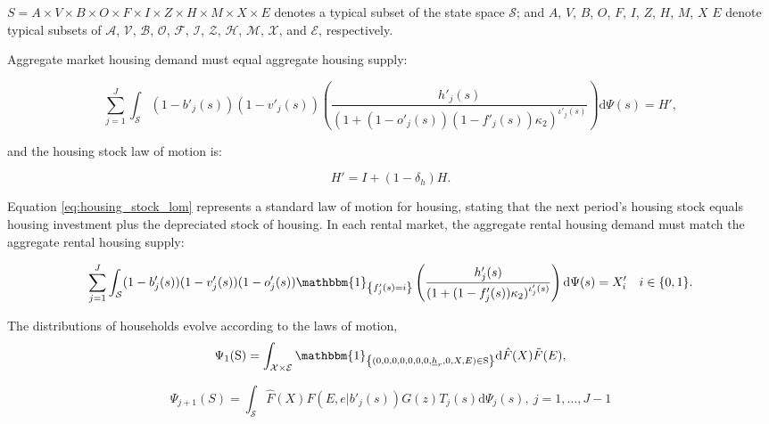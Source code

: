 \documentclass[parskip=full]{article}
\newcommand{\indicator}[1]{\mathbbm{1}_{\left\{ {#1} \right\} }}
\begin{document}
$S=A\times V\times B\times O \times F \times I \times Z \times H\times M\times X \times E$ denotes a typical subset of the state space $\mathcal{S}$; and $A$, $V$, $B$, $O$, $F$, $I$, $Z$, $H$, $M$, $X$ $E$ denote typical subsets of $\mathcal{A}$, $\mathcal{V}$, $\mathcal{B}$, $\mathcal{O}$, $\mathcal{F}$, $\mathcal{I}$, $\mathcal{Z}$, $\mathcal{H}$, $\mathcal{M}$, $\mathcal{X}$, and $\mathcal{E}$, respectively.

Aggregate market housing demand must equal aggregate housing supply:

\begin{equation}
\label{eq:housing_clearing_condition}
  \sum_{j=1}^J \int_\mathcal{S} (1-b'_{j}(s))(1-v'_{j}(s)) \left(\frac{h'_{j}(s)}{(1+(1-o'_{j}(s))(1-f'_{j}(s))\kappa_{2})^{\iota'_{j}(s)}}\right) \mathrm{d}\Psi(s) = H',
\end{equation}

\noindent and the housing stock law of motion is: 

\begin{equation}\label{eq:housing_stock_lom}
H'=I+(1-\delta_h)H.
\end{equation}

\noindent Equation \eqref{eq:housing_stock_lom} represents a standard law of motion for housing, stating that the next period's housing stock equals housing investment plus the depreciated stock of housing. In each rental market, the aggregate rental housing demand must match the aggregate rental housing supply:

\begin{equation}\label{eq:rental_housing_clearing_condition}
  \sum_{j=1}^J \int_\mathcal{S} (1-b'_{j}(s))(1-v'_{j}(s)) (1-o'_{j}(s))\indicator{f'_{j}(s)=i}\left(\frac{h'_{j}(s)}{(1+(1-f'_{j}(s))\kappa_{2})^{\iota'_{j}(s)}}\right) \mathrm{d}\Psi(s) = X'_{i} \quad i \in \{0,1\}.
\end{equation}

The distributions of households evolve according to the laws of motion,
\begin{equation}\label{eq:lom1}
\Psi_{1}(\mathrm{S})=\int_{\mathcal{X} \times \mathcal{E}} \indicator{(0,0,0,0,0,0,0,\underline{h}_{r},0,X,E)\in \mathrm{S}}\mathrm{d} \hat{F}(X)\tilde{F}(E),
\end{equation}


\begin{equation}\label{eq:lom2}
\Psi_{j+1}(S)=\int_{\mathcal{S}} \hat{F}(X)F(E,e|b'_{j}(s))G(z)T_{j}(s)\mathrm{d}\Psi_{j}(s),\ j=1,\ldots,J-1
\end{equation}
\end{document}
